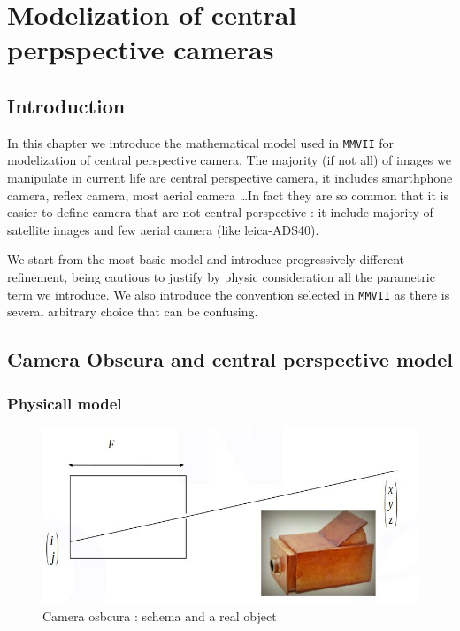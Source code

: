 \chapter{Modelization of central perpspective cameras}



\section{Introduction}

In this chapter we introduce the mathematical model used in {\tt MMVII}
for modelization of central perspective camera.  The majority (if not all)
of images we manipulate in current life are central perspective camera, it includes
smarthphone camera,  reflex camera,  most aerial camera \dots  In fact they are so common that
it is easier to define camera that are not central  perspective :
it include majority of satellite images and few aerial camera (like leica-ADS40).

We start from the most basic model and introduce progressively different refinement,
being cautious to justify by physic consideration all the parametric term we introduce.
We also introduce the convention selected in {\tt MMVII} as there is several arbitrary choice
that can be confusing.


\section{Camera Obscura and  central perspective model}

\subsection{Physicall model}

\begin{figure}
\centering
\includegraphics[width=12cm]{Methods/Images/CameraObscura.jpg}\caption{Camera osbcura : schema and a real object}
	\label{fig:CameraObscura}
\end{figure}


